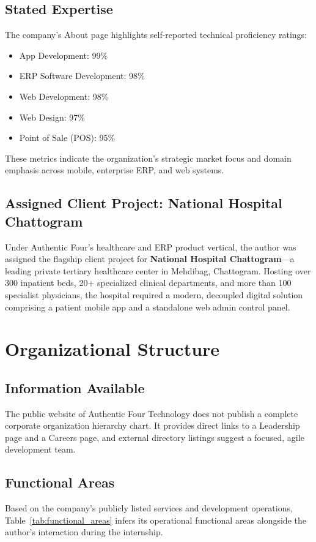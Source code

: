 \documentclass[11pt,a4paper,oneside]{report}
\begin{document}
\section{Stated Expertise}
The company's About page highlights self-reported technical proficiency ratings:
\begin{itemize}
    \item App Development: 99\%
    \item ERP Software Development: 98\%
    \item Web Development: 98\%
    \item Web Design: 97\%
    \item Point of Sale (POS): 95\%
\end{itemize}
These metrics indicate the organization's strategic market focus and domain emphasis across mobile, enterprise ERP, and web systems.

\section{Assigned Client Project: National Hospital Chattogram}
Under Authentic Four's healthcare and ERP product vertical, the author was assigned the flagship client project for \textbf{National Hospital Chattogram}---a leading private tertiary healthcare center in Mehdibag, Chattogram. Hosting over 300 inpatient beds, 20+ specialized clinical departments, and more than 100 specialist physicians, the hospital required a modern, decoupled digital solution comprising a patient mobile app and a standalone web admin control panel.

\chapter{Organizational Structure}

\section{Information Available}
The public website of Authentic Four Technology does not publish a complete corporate organization hierarchy chart. It provides direct links to a Leadership page and a Careers page, and external directory listings suggest a focused, agile development team.

\section{Functional Areas}
Based on the company's publicly listed services and development operations, Table~\ref{tab:functional_areas} infers its operational functional areas alongside the author's interaction during the internship.
\end{document}

